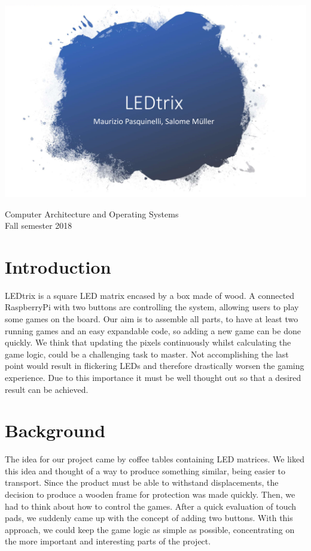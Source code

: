 \documentclass[a4paper,12pt]{article}
\begin{document}
\begin{titlepage}
\centering
\vspace*{5cm}

 \includegraphics[width = 1\textwidth]{LEDtrix_Logo.png}
\vspace{1cm}

\large{Computer Architecture and Operating Systems\\Fall semester 2018}
\end{titlepage}
 
 \section{Introduction}
 
 LEDtrix is a square LED matrix encased by a box made of wood. A connected RaspberryPi with two buttons are controlling the system, allowing users to play some games on the board.
 Our aim is to assemble all parts, to have at least two running games and an easy expandable code, so adding a new game can be done quickly.
 We think that updating the pixels continuously whilst calculating the game logic, could be a challenging task to master.
 Not accomplishing the last point would result in flickering LEDs and therefore drastically worsen the gaming experience.
 Due to this importance it must be well thought out so that a desired result can be achieved.
 
 \section{Background}
 
 The idea for our project came by coffee tables containing LED matrices.
 We liked this idea and thought of a way to produce something similar, being easier to transport.
 Since the product must be able to withstand displacements, the decision to produce a wooden frame for protection was made quickly.
 Then, we had to think about how to control the games.
 After a quick evaluation of touch pads, we suddenly came up with the concept of adding two buttons.
 With this approach, we could keep the game logic as simple as possible, concentrating on the more important and interesting parts of the project.
 
\end{document}
